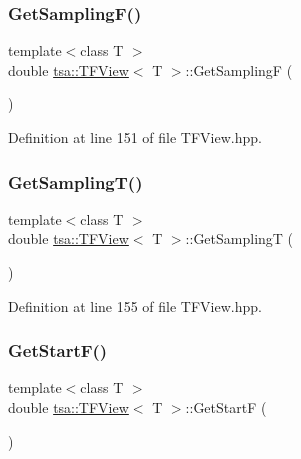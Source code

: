 \subsubsection{\texorpdfstring{Get\+Sampling\+F()}{GetSamplingF()}}
{\footnotesize\ttfamily template$<$class T $>$ \\
double \hyperlink{classtsa_1_1_t_f_view}{tsa\+::\+T\+F\+View}$<$ T $>$\+::Get\+SamplingF (\begin{DoxyParamCaption}{ }\end{DoxyParamCaption})\hspace{0.3cm}{\ttfamily [inline]}}



Definition at line 151 of file T\+F\+View.\+hpp.

\mbox{\label{classtsa_1_1_t_f_view_a3f014481f5ed76c12a3ab831952e4e3d}} 
\subsubsection{\texorpdfstring{Get\+Sampling\+T()}{GetSamplingT()}}
{\footnotesize\ttfamily template$<$class T $>$ \\
double \hyperlink{classtsa_1_1_t_f_view}{tsa\+::\+T\+F\+View}$<$ T $>$\+::Get\+SamplingT (\begin{DoxyParamCaption}{ }\end{DoxyParamCaption})\hspace{0.3cm}{\ttfamily [inline]}}



Definition at line 155 of file T\+F\+View.\+hpp.

\mbox{\label{classtsa_1_1_t_f_view_acb07eb67f2ef12f13b4f91941bda15d5}} 
\subsubsection{\texorpdfstring{Get\+Start\+F()}{GetStartF()}}
{\footnotesize\ttfamily template$<$class T $>$ \\
double \hyperlink{classtsa_1_1_t_f_view}{tsa\+::\+T\+F\+View}$<$ T $>$\+::Get\+StartF (\begin{DoxyParamCaption}{ }\end{DoxyParamCaption})\hspace{0.3cm}{\ttfamily [inline]}}



